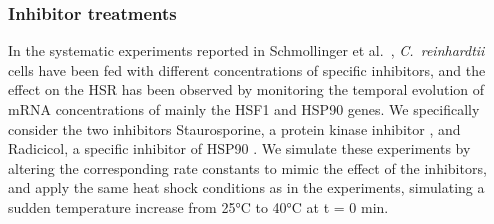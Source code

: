\documentclass[oneside, 10pt, a4paper, twocolumn]{article}
\begin{document}
\subsubsection{Inhibitor treatments}
\label{SecFeeding}

In the systematic experiments reported in Schmollinger et al.~\cite{Schmollinger2013}, \textit{C.~reinhardtii} cells have been fed
with different concentrations of specific inhibitors, and the effect on the HSR
has been observed by monitoring the temporal evolution of mRNA concentrations
of mainly the HSF1 and HSP90 genes.
We specifically consider the two inhibitors Staurosporine, a protein kinase inhibitor \cite{Karaman2008}, 
and Radicicol, a specific inhibitor of HSP90 \cite{Roe1999}. 
We simulate these experiments by altering the corresponding rate constants to mimic the effect of 
the inhibitors, and apply the same heat shock conditions as in the experiments,
simulating a sudden temperature increase from 25°C to 40°C at t = 0 min.





\end{document}
